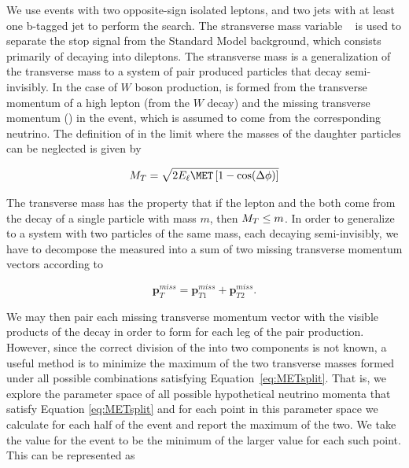   We use events with two opposite-sign isolated leptons, and two jets with at least one b-tagged jet to perform the search. The stransverse
  mass variable \mtll~\cite{Lester:1999tx} is used to separate the stop signal from the Standard Model background, which consists primarily of \ttbar decaying into dileptons.
  The stransverse mass is a generalization of the transverse mass \mt to a system of pair produced particles that decay semi-invisibly. 
  In the case of $W$ boson production, \mt is formed from the transverse momentum of a high \pt lepton (from the $W$ decay) and the missing transverse momentum (\met) in the event, 
  which is assumed to come from the corresponding neutrino. The definition of \mt in the limit where the masses of the daughter particles can be neglected is given by

  \begin{equation}
    \label{eq:mt}
    \mt = \sqrt{2 E_\ell \met \left[1 - \cos(\Delta\phi)\right]}
  \end{equation}

  The transverse mass has the property that if the lepton and the \met both come from the decay of a
  single particle with mass $m$, then $M_{T} \leq m$. In order to generalize to a system with two particles
  of the same mass, each decaying semi-invisibly, we have to decompose the measured \met into
  a sum of two missing transverse momentum vectors according to %
 
  \begin{equation}
    \label{eq:METsplit}
    \mathbf{p}_T^{miss} = \mathbf{p}_{T1}^{miss} + \mathbf{p}_{T2}^{miss}.
  \end{equation}

  We may then pair each missing transverse momentum vector with the visible products of the
  decay in order to form \mt for each leg of the pair production. However, since the correct division of the \met into two components is not known, 
  a useful method is to minimize the maximum of the two transverse masses formed under all possible combinations satisfying Equation~\ref{eq:METsplit}. 
  That is, we explore the parameter space of all possible hypothetical neutrino momenta
  that satisfy Equation \ref{eq:METsplit} and for each point in this parameter space we calculate \mt for each half
  of the event and report the maximum of the two. We take the \mtll value for the event to be the
  minimum of the larger \mt value for each such point. This can be represented as %

